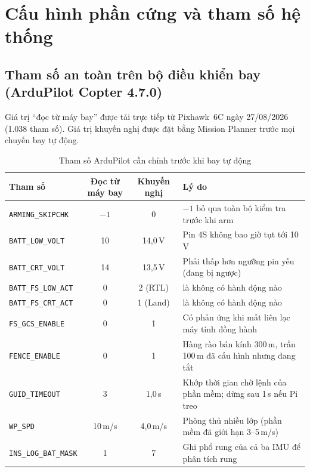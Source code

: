 \chapter{Cấu hình phần cứng và tham số hệ thống}
\label{pl:a}

\section{Tham số an toàn trên bộ điều khiển bay (ArduPilot Copter 4.7.0)}

Giá trị ``đọc từ máy bay'' được tải trực tiếp từ Pixhawk~6C ngày 27/08/2026 (1.038 tham số). Giá trị khuyến nghị được đặt bằng Mission Planner trước mọi chuyến bay tự động.

\begin{table}[H]
\centering
\caption{Tham số ArduPilot cần chỉnh trước khi bay tự động}
\label{tab:plthamso}
\small
\renewcommand{\arraystretch}{1.15}
\begin{tabularx}{\textwidth}{@{}lcc>{\raggedright\arraybackslash}X@{}}
\toprule
\textbf{Tham số} & \textbf{Đọc từ máy bay} & \textbf{Khuyến nghị} & \textbf{Lý do}\\
\midrule
\texttt{ARMING\_SKIPCHK} & $-1$ & 0 & $-1$ bỏ qua toàn bộ kiểm tra trước khi arm\\
\texttt{BATT\_LOW\_VOLT} & 10 & 14,0\,V & Pin 4S không bao giờ tụt tới 10\,V\\
\texttt{BATT\_CRT\_VOLT} & 14 & 13,5\,V & Phải thấp hơn ngưỡng pin yếu (đang bị ngược)\\
\texttt{BATT\_FS\_LOW\_ACT} & 0 & 2 (RTL) & 0 là không có hành động nào\\
\texttt{BATT\_FS\_CRT\_ACT} & 0 & 1 (Land) & 0 là không có hành động nào\\
\texttt{FS\_GCS\_ENABLE} & 0 & 1 & Có phản ứng khi mất liên lạc máy tính đồng hành\\
\texttt{FENCE\_ENABLE} & 0 & 1 & Hàng rào bán kính 300\,m, trần 100\,m đã cấu hình nhưng đang tắt\\
\texttt{GUID\_TIMEOUT} & 3 & 1,0\,s & Khớp thời gian chờ lệnh của phần mềm; dừng sau 1\,s nếu Pi treo\\
\texttt{WP\_SPD} & 10\,m/s & 4,0\,m/s & Phòng thủ nhiều lớp (phần mềm đã giới hạn 3--5\,m/s)\\
\texttt{INS\_LOG\_BAT\_MASK} & 1 & 7 & Ghi phổ rung của cả ba IMU để phân tích rung\\
\bottomrule
\end{tabularx}
\end{table}

